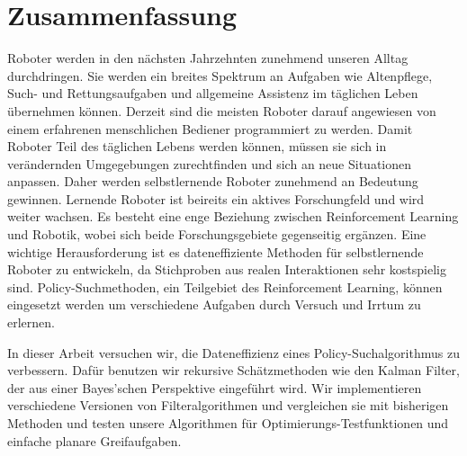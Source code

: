 
\chapter*{Zusammenfassung}
Roboter werden in den nächsten Jahrzehnten zunehmend unseren
Alltag durchdringen. Sie werden ein breites Spektrum an
Aufgaben wie Altenpflege, Such- und Rettungsaufgaben und allgemeine
Assistenz im täglichen Leben übernehmen können.
Derzeit sind die meisten Roboter darauf angewiesen von einem
erfahrenen menschlichen Bediener programmiert zu werden.
Damit Roboter Teil des täglichen Lebens werden können, müssen sie
sich in verändernden Umgegebungen zurechtfinden und sich an
neue Situationen anpassen.
Daher werden selbstlernende Roboter zunehmend an Bedeutung gewinnen.
Lernende Roboter ist beireits ein aktives Forschungfeld
und wird weiter wachsen.
Es besteht eine enge Beziehung zwischen Reinforcement Learning und
Robotik, wobei sich beide Forschungsgebiete gegenseitig ergänzen.
Eine wichtige Herausforderung ist es dateneffiziente Methoden
für selbstlernende Roboter zu entwickeln, da Stichproben
aus realen Interaktionen sehr kostspielig sind.
Policy-Suchmethoden, ein Teilgebiet des Reinforcement Learning,
können eingesetzt werden um verschiedene Aufgaben durch Versuch und Irrtum
zu erlernen.

In dieser Arbeit versuchen wir, die Dateneffizienz eines
Policy-Suchalgorithmus zu verbessern.
Dafür benutzen wir rekursive Schätzmethoden wie den Kalman
Filter, der aus einer Bayes'schen Perspektive eingeführt wird.
Wir implementieren verschiedene Versionen von Filteralgorithmen
und vergleichen sie mit bisherigen Methoden
und testen unsere Algorithmen für Optimierungs-Testfunktionen und einfache
planare Greifaufgaben.

